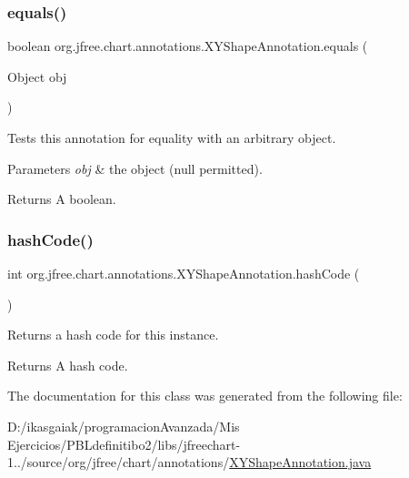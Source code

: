 \subsubsection{\texorpdfstring{equals()}{equals()}}
{\footnotesize\ttfamily boolean org.\+jfree.\+chart.\+annotations.\+X\+Y\+Shape\+Annotation.\+equals (\begin{DoxyParamCaption}\item[{Object}]{obj }\end{DoxyParamCaption})}

Tests this annotation for equality with an arbitrary object.


\begin{DoxyParams}{Parameters}
{\em obj} & the object ({\ttfamily null} permitted).\\
\hline
\end{DoxyParams}
\begin{DoxyReturn}{Returns}
A boolean. 
\end{DoxyReturn}
\mbox{\label{classorg_1_1jfree_1_1chart_1_1annotations_1_1_x_y_shape_annotation_a791a110d88d4fb24f19839d6dd482f38}} 
\subsubsection{\texorpdfstring{hash\+Code()}{hashCode()}}
{\footnotesize\ttfamily int org.\+jfree.\+chart.\+annotations.\+X\+Y\+Shape\+Annotation.\+hash\+Code (\begin{DoxyParamCaption}{ }\end{DoxyParamCaption})}

Returns a hash code for this instance.

\begin{DoxyReturn}{Returns}
A hash code. 
\end{DoxyReturn}


The documentation for this class was generated from the following file\+:\begin{DoxyCompactItemize}
\item 
D\+:/ikasgaiak/programacion\+Avanzada/\+Mis Ejercicios/\+P\+B\+Ldefinitibo2/libs/jfreechart-\/1../source/org/jfree/chart/annotations/\mbox{\hyperlink{_x_y_shape_annotation_8java}{X\+Y\+Shape\+Annotation.\+java}}\end{DoxyCompactItemize}
